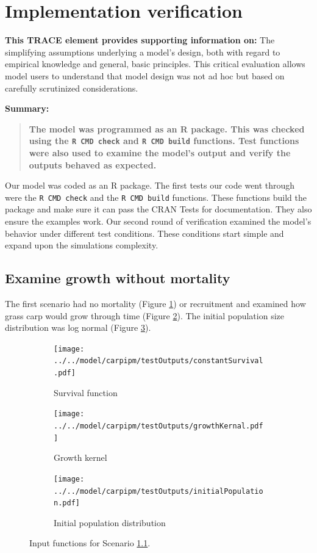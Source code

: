 \documentclass{article}[12pt]
\begin{document}
\section{Implementation verification}\label{sec:IpVer}
\textbf{This TRACE element provides supporting information on:} The simplifying assumptions underlying a model's design, both with regard to empirical knowledge and general, basic principles. This critical evaluation allows model users to understand that model design was not ad hoc but based on carefully scrutinized considerations. 

\textbf{Summary:}
\begin{verse}
\textbf{
The model was programmed as an R package.
This was checked using the \texttt{R CMD check} and \texttt{R CMD build} functions. 
Test functions were also used to  examine the model's output and verify the outputs behaved as expected.
}
\end{verse}

Our model was coded as an R package.
The first tests our code went through were the \texttt{R CMD check} and the \texttt{R CMD build} functions.
These functions build the package and make sure it can pass the CRAN Tests for documentation.
They also ensure the examples work.
Our second round of verification examined the model's behavior under different test conditions.
These conditions start simple and expand upon the simulations complexity. 


\subsection{Examine growth without mortality}\label{egwm}

The first scenario had no mortality (Figure \ref{fig:suv1}) or recruitment and examined how grass carp would grow through time (Figure \ref{fig:grow1}).
The initial population size distribution was log normal (Figure \ref{fig:ip1}).

\begin{figure}[htbp]
	\centering
	\begin{subfigure}[b]{0.2\textwidth}
		\texttt{[image: ../../model/carpipm/testOutputs/constantSurvival.pdf]} 
		\caption{Survival function} 
		\label{fig:suv1}
	\end{subfigure}
	\qquad
	\begin{subfigure}[b]{0.3\textwidth}
		\texttt{[image: ../../model/carpipm/testOutputs/growthKernal.pdf]} 
		\caption{Growth kernel} 
		\label{fig:grow1}
	\end{subfigure}
	\qquad
	\begin{subfigure}[b]{0.2\textwidth}
		\texttt{[image: ../../model/carpipm/testOutputs/initialPopulation.pdf]} 
		\caption{Initial population distribution} 
		\label{fig:ip1}
	\end{subfigure}
   \caption{Input functions for Scenario \ref{egwm}.}
   \label{fig:scn1}
\end{figure}
\end{document}
